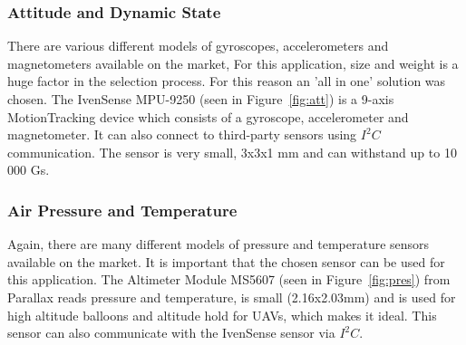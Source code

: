 \documentclass[10pt, a4paper]{article}
\begin{document}
\subsubsection{Attitude and Dynamic State}
There are various different models of gyroscopes, accelerometers and magnetometers available on the market,  For this application, size and weight is a huge factor in the selection process.  For this reason an 'all in one' solution was chosen.  The IvenSense MPU-9250 (seen in Figure~\ref{fig:att}) is a 9-axis MotionTracking device which consists of a gyroscope, accelerometer and magnetometer.  It can also connect to third-party sensors using $I^2C$ communication.  The sensor is very small, 3x3x1 mm and can withstand up to 10 000 Gs.
\subsubsection{Air Pressure and Temperature}
Again, there are many different models of pressure and temperature sensors available on the market.  It is important that the chosen sensor can be used for this application.  The Altimeter Module MS5607 (seen in Figure~\ref{fig:pres}) from Parallax reads pressure and temperature, is small (2.16x2.03mm) and is used for high altitude balloons and altitude hold for UAVs, which makes it ideal.  This sensor can also communicate with the IvenSense sensor via $I^2C$.
\end{document}

